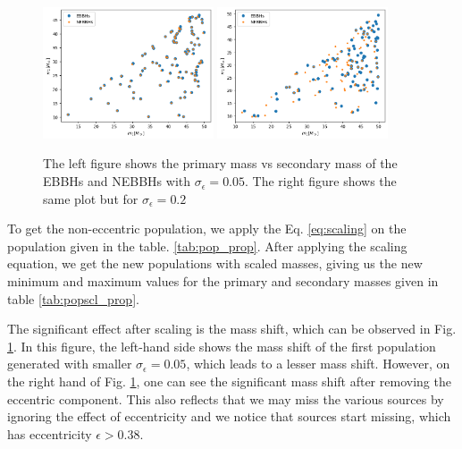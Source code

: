 \documentclass[twocolumn,prd,nofootinbib]{revtex4}
\begin{document}
\begin{figure}

\includegraphics[width=0.45\textwidth]{paper/figures/pop2d_0.05.png}
\includegraphics[width=0.45\textwidth]{paper/figures/pop2d_0.2.png}
\caption{\label{fig:pop2d_0.05_0.2} The left figure shows the primary mass vs secondary mass of the EBBHs and NEBBHs with $\sigma_\epsilon =0.05$. The right figure shows the same plot but for $\sigma_\epsilon=0.2$} 

\end{figure}




To get the non-eccentric population, we apply the Eq. \ref{eq:scaling} on the population given in the table. \ref{tab:pop_prop}. After applying the scaling equation, we get the new populations with scaled masses, giving us the new minimum and maximum values for the primary and secondary masses given in table \ref{tab:popscl_prop}.
   


The significant effect after scaling is the mass shift, which can be observed in Fig. \ref{fig:pop2d_0.05_0.2}. In this figure, the left-hand side shows the mass shift of the first population generated with smaller $\sigma_\epsilon =0.05$, which leads to a lesser mass shift. However, on the right hand of Fig. \ref{fig:pop2d_0.05_0.2}, one can see the significant mass shift after removing the eccentric component.  This also reflects that we may miss the various sources by ignoring the effect of eccentricity and we notice that sources start missing, which has eccentricity $\epsilon>0.38$.
\end{document}
